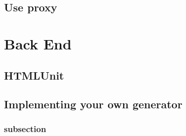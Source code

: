 \documentclass[a4paper,11pt]{kth-mag}
\begin{document}
\section{Use proxy}

\chapter{Back End}

\section{HTMLUnit}


\section{Implementing your own generator}
\label{backendimpl}

\subsection{subsection}
\end{document}

